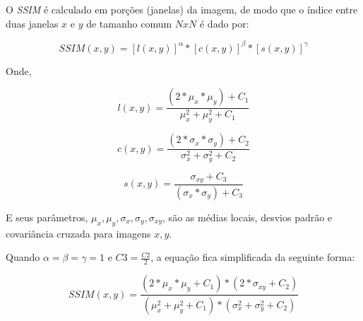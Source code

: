 O \textit{SSIM} é calculado em porções (janelas) da imagem, de modo que o índice entre duas janelas $x$ e $y$ de tamanho comum $NxN$ é dado por:

\begin{equation}
    SSIM(x,y) = [l(x,y)]^\alpha * [c(x,y)]^\beta * [s(x,y)]^\gamma
\end{equation}

Onde,

\begin{equation}
    l(x,y) = \frac{(2 * \mu_x * \mu_y) + C_1}{\mu_x^2 + \mu_y^2 + C_1}
\end{equation}

\begin{equation}
    c(x,y) = \frac{(2 * \sigma_x * \sigma_y) + C_2}{\sigma_x^2 + \sigma_y^2 + C_2}
\end{equation}

\begin{equation}
    s(x,y) = \frac{\sigma_{xy} + C_3}{(\sigma_x * \sigma_y) + C_3}
\end{equation}

E seus parâmetros, $\mu_x, \mu_y, \sigma_x, \sigma_y, \sigma_{xy}$, são as médias locais, desvios padrão e covariância cruzada para imagens $x, y$.

Quando $\alpha = \beta = \gamma = 1$ e $C3 = \frac{C2}{2}$, a equação fica simplificada da seguinte forma:

\begin{equation}
    SSIM(x,y) = \frac{(2 * \mu_x * \mu_y + C_1) * (2 * \sigma_{xy} + C_2)}{(\mu_x^2 + \mu_y^2 + C_1) * (\sigma_x^2 + \sigma_y^2 + C_2)}
\end{equation}

